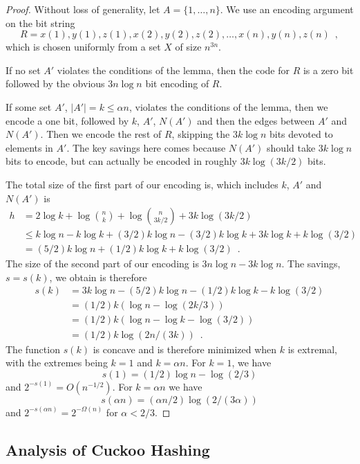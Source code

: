 \documentclass{patmorin}
\begin{document}
\begin{proof}
Without loss of generality, let $A=\{1,\ldots,n\}$.  We use an encoding argument on the bit string
\[
   R = x(1), y(1), z(1), x(2), y(2), z(2), \ldots, x(n), y(n), z(n) \enspace ,
\]
which is chosen uniformly from a set $X$ of size $n^{3n}$.

If no set $A'$ violates the conditions of the lemma, then the code for
$R$ is a zero bit followed by the obvious $3n\log n$ bit encoding of $R$.

If some set $A'$, $|A'|=k\le \alpha n$, violates the conditions of the
lemma, then we encode a one bit, followed by $k$, $A'$, $N(A')$ and
then the edges between $A'$ and $N(A')$.  Then we encode the rest of
$R$, skipping the $3k\log n$ bits devoted to elements in $A'$.  The key
savings here comes because $N(A')$ should take $3k\log n$ bits to encode,
but can actually be encoded in roughly $3k\log(3k/2)$ bits.

The total size of the first part of our encoding is, which includes $k$,
$A'$ and $N(A')$ is
\begin{align*}
    h & = 2\log k + \log\binom{n}{k} + \log\binom{n}{3k/2} + 3k\log (3k/2) \\
       & \le k\log n - k\log k + (3/2)k\log n - (3/2)k\log k + 3k\log k + k\log(3/2) \\
      & = (5/2)k\log n + (1/2)k\log k + k\log(3/2)  \enspace .
\end{align*}
The size of the second part of our encoding is $3n\log n - 3k\log n$.  The savings, $s=s(k)$, we obtain is therefore
\begin{align*}
     s(k) & = 3k\log n - (5/2)k\log n - (1/2)k\log k - k\log(3/2) \\
       & = (1/2)k(\log n - \log(2k/3)) \\
       & = (1/2)k(\log n - \log k - \log(3/2)) \\
       & = (1/2)k\log(2n/(3k)) \enspace .
\end{align*}
The function $s(k)$ is concave and is therefore minimized when $k$
is extremal, with the extremes being $k=1$ and $k=\alpha
n$. For $k=1$, we have
\[
    s(1)=(1/2)\log n - \log(2/3)
\]
and $2^{-s(1)} = O(n^{-1/2})$.  For $k=\alpha n$ we have
\[
   s(\alpha n) = (\alpha n/2)\log(2/(3\alpha))
\]
and $2^{-s(\alpha n)} = 2^{-\Omega(n)}$ for $\alpha < 2/3$.
\end{proof}

\subsection{Analysis of Cuckoo Hashing}
\end{document}
